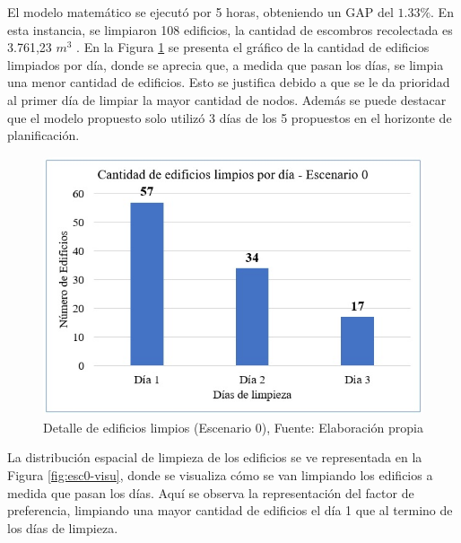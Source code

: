 \documentclass[letterpaper,conference]{IEEEtran}
\begin{document}


El modelo matemático se ejecutó por 5 horas, obteniendo un GAP del $1.33\%$. En esta instancia, se limpiaron 108 edificios, la cantidad de escombros recolectada es 3.761,23 $m^{3}$ .
En la Figura \ref{fig:esc0-graf} se presenta el gráfico de la cantidad de edificios limpiados por día, donde se aprecia que, a medida que pasan los días, se limpia una menor cantidad de edificios. Esto se justifica debido a que se le da prioridad al primer día de limpiar la mayor cantidad de nodos. Además se puede destacar que el modelo propuesto solo utilizó 3 días de los 5 propuestos en el horizonte de planificación.



\begin{figure}[h!]
\centering
\includegraphics[scale=0.7]{Figuras/INDIC1.jpg} 
\caption{Detalle de edificios limpios (Escenario 0), Fuente: Elaboración propia}
\label{fig:esc0-graf}
\end{figure}


La distribución espacial de limpieza de los edificios se ve representada en la Figura \ref{fig:esc0-visu}, donde se visualiza cómo se van limpiando los edificios a medida que pasan los días. Aquí se observa la representación del factor de preferencia, limpiando una mayor cantidad de edificios el día 1 que al termino de los días de limpieza.
\end{document}
